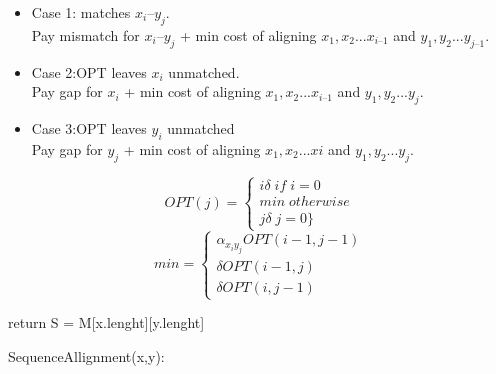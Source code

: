 \begin{itemize}

    \item {Case 1: matches $x_{i} – y_{j}$.}\\
          Pay mismatch for $x_{i} – y_{j}$ + min cost of aligning $x_{1}, x_{2} ... x_{i–1}$ and $y_{1} ,y_{2} ... y_{j–1}$.

    \item {Case 2:OPT leaves $x_{i}$ unmatched.}\\
          Pay gap for $x_{i}$ + min cost of aligning $x_{1}, x_{2} ... x_{i–1}$ and $y_{1}, y_{2} ... y_{j}$.

    \item {Case 3:OPT leaves $y_{i}$ unmatched}\\
          Pay gap for $y_{j}$ + min cost of aligning $x{_1},x_{2} ... x{i}$ and $y_{1}, y_{2} ... y_{j}$.

\end{itemize}

\[OPT(j) = \begin{cases} i\delta \; if \; i = 0 \\ min \;otherwise \\ j\delta \; j=0 \}  \end{cases}\]
\[min=\begin{cases} \alpha _{x_{i} y_{j}} OPT(i−1, j-1) \\ \delta OPT(i−1, j) \\ \delta  O P T ( i , j − 1 )  \end{cases}\]


\begin{algorithm}[H]
    \SetAlgoLined
    \small

    \BlankLine


    \BlankLine


    \BlankLine


    \BlankLine
    return S = M[x.lenght][y.lenght]


    \caption{SequenceAllignment(x,y):}
\end{algorithm}

